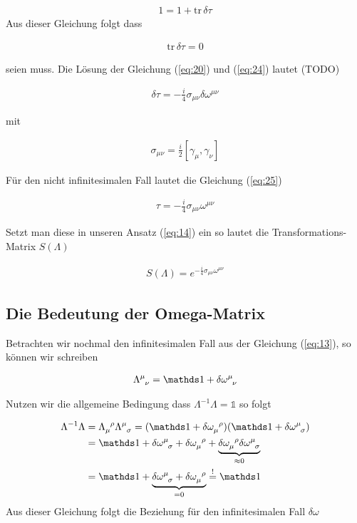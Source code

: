 \begin{align}
  \label{eq:23}
  1 =  1 + \text{tr}\,\delta\tau 
\end{align}
Aus dieser Gleichung folgt dass

\begin{align}
  \label{eq:24}
  \text{tr}\,\delta\tau = 0
\end{align}

seien muss. Die Lösung der Gleichung (\ref{eq:20}) und (\ref{eq:24}) lautet (TODO)

\begin{align}
  \label{eq:25}
  \delta\tau = -\frac{i}{4}\sigma_{\mu\nu}\delta\omega^{\mu\nu}
\end{align}

mit

\begin{align}
  \label{eq:26}
 \boxed{ \sigma_{\mu\nu} = \frac{i}{2}[\gamma_\mu,\gamma_\nu] }
\end{align}

Für den nicht infinitesimalen Fall lautet die Gleichung (\ref{eq:25})

\begin{align}
  \label{eq:28}
  \tau = -\frac{i}{4}\sigma_{\mu\nu}\omega^{\mu\nu}
\end{align}

Setzt man diese in unseren Ansatz (\ref{eq:14}) ein so lautet die Transformations-Matrix \(S(\Lambda)\)

\begin{align}
  \label{eq:27}
 \boxed{ S(\Lambda) = e^{-\frac{i}{4}\sigma_{\mu\nu}\omega^{\mu\nu}} }
\end{align}


\subsection*{Die Bedeutung der Omega-Matrix}


Betrachten wir nochmal den infinitesimalen Fall aus der Gleichung (\ref{eq:13}), so können wir schreiben

\begin{align}
  \label{eq:30}
  \Lambda^{\mu}_{\hphantom\mu \nu} = \mathds 1 + \delta\omega^\mu_{\hphantom\mu \nu}
\end{align}

Nutzen wir die allgemeine Bedingung dass \(\Lambda^{-1}\Lambda = \mathds 1\) so folgt


\begin{align}
  \label{eq:31}
  \Lambda^{-1}\Lambda &=\Lambda_{\mu}^{\hphantom \mu \rho}\Lambda^{\mu}_{\hphantom\mu \sigma}= ( \mathds 1 + \delta\omega^{\hphantom\mu \rho}_\mu)( \mathds 1 + \delta\omega^\mu_{\hphantom\mu \sigma} ) \notag \\
&= \mathds 1 + \delta\omega^\mu_{\hphantom\mu \sigma} + \delta\omega^{\hphantom\mu \rho}_\mu + \underbr{ \delta\omega^{\hphantom\mu \rho}_\mu\delta\omega^\mu_{\hphantom\mu \sigma} }_{\approx 0}\notag\\
&= \mathds 1 + \underbr{\delta\omega^\mu_{\hphantom\mu \sigma} + \delta\omega^{\hphantom\mu \rho}_\mu }_{=0}\stackrel{!}=\mathds 1 
\end{align}
Aus dieser Gleichung folgt die Beziehung für den infinitesimalen Fall \(\delta\omega\)

